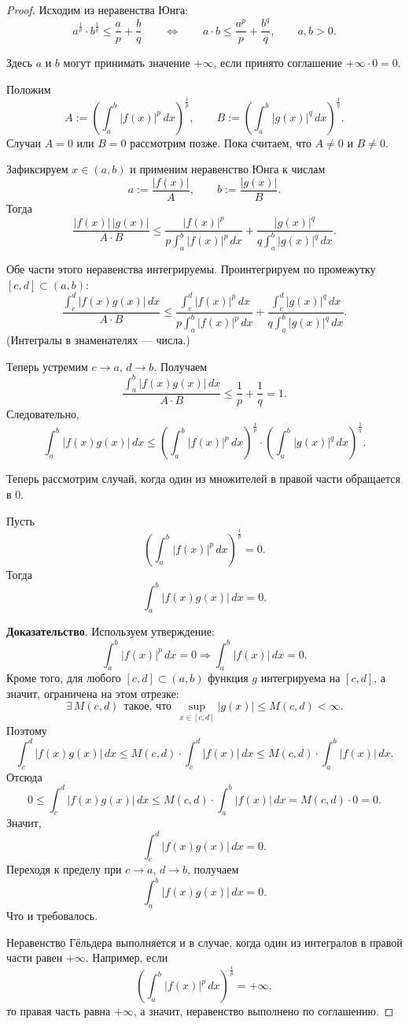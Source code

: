 \begin{proof}
	Исходим из неравенства Юнга:
	\[
	a^{\frac{1}{p}} \cdot b^{\frac{1}{q}} \le \frac{a}{p} + \frac{b}{q}
	\qquad \Longleftrightarrow \qquad
	a \cdot b \le \frac{a^p}{p} + \frac{b^q}{q},
	\qquad a,b>0.
	\]
	
	\begin{remark}
		Здесь $a$ и $b$ могут принимать значение $+\infty$, если принято соглашение $+\infty \cdot 0 = 0$.
	\end{remark}
	
	Положим
	\[
	A:=\left(\int_a^b |f(x)|^p\,dx\right)^{\frac{1}{p}},
	\qquad
	B:=\left(\int_a^b |g(x)|^q\,dx\right)^{\frac{1}{q}}.
	\]
	Случаи $A=0$ или $B=0$ рассмотрим позже. Пока считаем, что $A\ne 0$ и $B\ne 0$.
	
	Зафиксируем $x\in(a,b)$ и применим неравенство Юнга к числам
	\[
	a:=\frac{|f(x)|}{A},
	\qquad
	b:=\frac{|g(x)|}{B}.
	\]
	Тогда
	\[
	\frac{|f(x)|\,|g(x)|}{A\cdot B}
	\le
	\frac{|f(x)|^p}{p\int_a^b |f(x)|^p\,dx}
	+
	\frac{|g(x)|^q}{q\int_a^b |g(x)|^q\,dx}.
	\]
	
	Обе части этого неравенства интегрируемы. Проинтегрируем по промежутку $[c,d]\subset(a,b)$:
	\[
	\frac{\int_c^d |f(x)g(x)|\,dx}{A\cdot B}
	\le
	\frac{\int_c^d |f(x)|^p\,dx}{p\int_a^b |f(x)|^p\,dx}
	+
	\frac{\int_c^d |g(x)|^q\,dx}{q\int_a^b |g(x)|^q\,dx}.
	\]
	(Интегралы в знаменателях --- числа.)
	
	Теперь устремим $c\to a$, $d\to b$. Получаем
	\[
	\frac{\int_a^b |f(x)g(x)|\,dx}{A\cdot B}
	\le
	\frac{1}{p}+\frac{1}{q}=1.
	\]
	Следовательно,
	\[
	\int_a^b |f(x)g(x)|\,dx
	\le
	\left(\int_a^b |f(x)|^p\,dx\right)^{\frac{1}{p}}
	\cdot
	\left(\int_a^b |g(x)|^q\,dx\right)^{\frac{1}{q}}.
	\]
	
	Теперь рассмотрим случай, когда один из множителей в правой части обращается в $0$.
	
	Пусть
	\[
	\left(\int_a^b |f(x)|^p\,dx\right)^{\frac{1}{p}}=0.
	\]
	Тогда
	\[
	\int_a^b |f(x)g(x)|\,dx=0.
	\]
	
	\textbf{Доказательство}. Используем утверждение:
	\[
	\int_a^b |f(x)|^p\,dx=0 \Longrightarrow \int_a^b |f(x)|\,dx=0.
	\]
	Кроме того, для любого $[c,d]\subset(a,b)$ функция $g$ интегрируема на $[c,d]$, а значит, ограничена на этом отрезке:
	\[
	\exists\, M(c,d)\ \ \text{такое, что}\ \ \sup_{x\in[c,d]} |g(x)| \le M(c,d) < \infty.
	\]
	Поэтому
	\[
	\int_c^d |f(x)g(x)|\,dx
	\le
	M(c,d)\cdot \int_c^d |f(x)|\,dx
	\le
	M(c,d)\cdot \int_a^b |f(x)|\,dx.
	\]
	Отсюда
	\[
	0 \le \int_c^d |f(x)g(x)|\,dx \le M(c,d)\cdot \int_a^b |f(x)|\,dx = M(c,d)\cdot 0 = 0.
	\]
	Значит,
	\[
	\int_c^d |f(x)g(x)|\,dx=0.
	\]
	Переходя к пределу при $c\to a$, $d\to b$, получаем
	\[
	\int_a^b |f(x)g(x)|\,dx=0.
	\]
	Что и требовалось.
	
	\medskip
	Неравенство Гёльдера выполняется и в случае, когда один из интегралов в правой части равен $+\infty$. Например, если
	\[
	\left(\int_a^b |f(x)|^p\,dx\right)^{\frac{1}{p}}=+\infty,
	\]
	то правая часть равна $+\infty$, а значит, неравенство выполнено по соглашению.
\end{proof}

